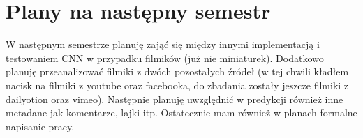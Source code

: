\documentclass{article}
\begin{document}
\section{Plany na następny semestr}
W następnym semestrze planuję zająć się między innymi implementacją i testowaniem CNN w przypadku filmików (już nie miniaturek). Dodatkowo planuję przeanalizować filmiki z dwóch pozostałych źródeł (w tej chwili kładłem nacisk na filmiki z youtube oraz facebooka, do zbadania zostały jeszcze filmiki z dailyotion oraz vimeo). Następnie planuję uwzględnić w predykcji również inne metadane jak komentarze, lajki itp. Ostatecznie mam również w planach formalne napisanie pracy.
\end{document}

